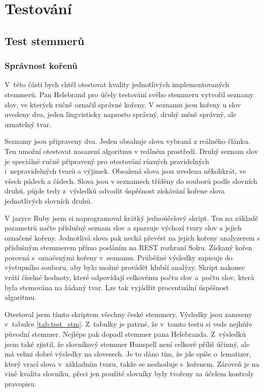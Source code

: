\chapter{Testování} \label{testing}
\section{Test stemmerů}
\subsection{Správnost kořenů}
V~této části bych chtěl otestovat kvality jednotlivých implementovaných stemmerů. Pan Helebrand pro účely testování svého stemmeru vytvořil seznamy slov, ve kterých ručně označil správné kořeny. V seznamu jsou kořeny u slov uvedeny dva, jeden lingvisticky naprosto správný, druhý méně správný, ale uznatelný tvar.

Seznamy jsou připraveny dva. Jeden obsahuje slova vybraná z reálného článku. Ten umožní otestovat nasazení algoritmu v reálném prostředí. Druhý seznam slov je speciálně ručně připravený pro otestování různých pravidelných i~nepravidelných tvarů a výjimek. Obsažená slova jsou uvedena několikrát, ve všech pádech a číslech. Slova jsou v seznamech tříděny do souborů podle slovních druhů, půjde tedy z~výsledků odvodit úspěšnost získávání kořene slova jednotlivých slovních druhů.

V jazyce Ruby jsem si naprogramoval krátký jednoúčelový skript. Ten na základě parametrů načte příslušný seznam slov a zparsuje výchozí tvary slov a jejich označené kořeny. Jednotlivá slova pak nechá převést na jejich kořeny analyzerem s příslušným stemmerem přímo posláním na REST rozhraní Solru. Získaný kořen porovná s~označenými kořeny v~seznamu. Průběžné výsledky zapisuje do výstupního souboru, aby bylo možné provádět hlubší analýzy. Skript nakonec vrátí číselné hodnoty, které odpovídají celkovému počtu slov a~počtu slov, která byla stemována na žádaný tvar. Lze tak vyjádřit procentuální úspěšnost algoritmu.

Otestoval jsem tímto skriptem všechny české stemmery. Výsledky jsou zaneseny v~tabulce \ref{tab:test_stm}. Z~tabulky je patrné, že v~tomto testu si vede nejhůře původní stemmer. Nejlépe pak dopadl stemmer pana Helebranda. Z~výsledků jsem také zjistil, že slovníkový stemmer Hunspell není celkově příliš účinný, ale má velmi dobré výsledky na slovesech. Je to dáno tím, že jde spíše o~lematizer, který vrací slova v~základním tvaru, takže se neshoduje s~kořenem. Zároveň je na vině kvalita slovníku, přeci jen použité slovníky byly tvořeny za účelem kontroly pravopisu.

